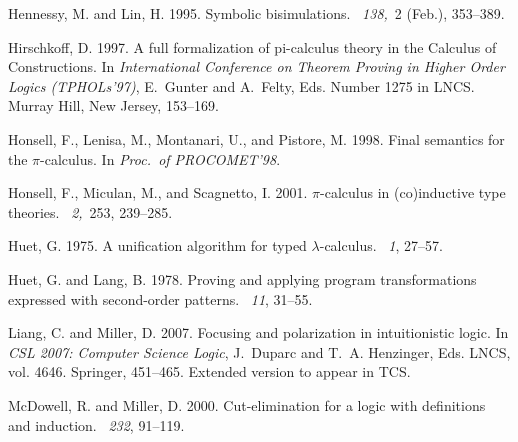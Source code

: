 \documentclass{acmtrans2m}
\begin{document}
\begin{thebibliography}{}
{\sc Hennessy, M.} {\sc and} {\sc Lin, H.} 1995.
\newblock Symbolic bisimulations.
~{\em 138,\/}~2 (Feb.), 353--389.

{\sc Hirschkoff, D.} 1997.
\newblock A full formalization of pi-calculus theory in the {Calculus of
  Constructions}.
\newblock In {\em International Conference on Theorem Proving in Higher Order
  Logics (TPHOLs'97)}, {E.~Gunter} {and} {A.~Felty}, Eds. Number 1275 in LNCS.
  Murray Hill, New Jersey, 153--169.

{\sc Honsell, F.}, {\sc Lenisa, M.}, {\sc Montanari, U.}, {\sc and} {\sc
  Pistore, M.} 1998.
\newblock Final semantics for the $\pi$-calculus.
\newblock In {\em Proc.~of PROCOMET'98}.

{\sc Honsell, F.}, {\sc Miculan, M.}, {\sc and} {\sc Scagnetto, I.} 2001.
\newblock $\pi$-calculus in (co)inductive type theories.
~{\em 2,\/}~253, 239--285.

{\sc Huet, G.} 1975.
\newblock A unification algorithm for typed $\lambda$-calculus.
~{\em 1}, 27--57.

{\sc Huet, G.} {\sc and} {\sc Lang, B.} 1978.
\newblock Proving and applying program transformations expressed with
  second-order patterns.
~{\em 11}, 31--55.

{\sc Liang, C.} {\sc and} {\sc Miller, D.} 2007.
\newblock Focusing and polarization in intuitionistic logic.
\newblock In {\em CSL 2007: Computer Science Logic}, {J.~Duparc} {and} {T.~A.
  Henzinger}, Eds. LNCS, vol. 4646. Springer, 451--465.
\newblock Extended version to appear in TCS.

{\sc McDowell, R.} {\sc and} {\sc Miller, D.} 2000.
\newblock Cut-elimination for a logic with definitions and induction.
~{\em 232}, 91--119.


\end{thebibliography}
\end{document}
